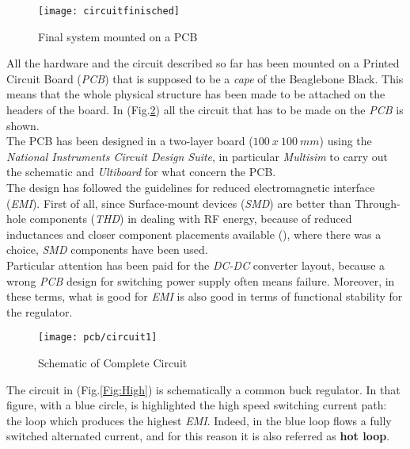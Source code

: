 

\begin{figure}[h]
	\centering
	\texttt{[image: circuitfinisched]}
	\caption{Final system mounted on a PCB}
	\label{Fig:finalcircuit}
\end{figure}


All the hardware and the circuit described so far has been mounted on a Printed Circuit Board (\textit{PCB}) that is supposed to be a \textit{cape} of the Beaglebone Black. This means that the whole physical structure has been made to be attached on the headers of the board. In (Fig.\ref{Fig:circuit}) all the circuit that has to be made on the \textit{PCB} is shown.\\

The PCB has been designed in a two-layer board ($100\ x\ 100\ mm$) using the \textit{National Instruments Circuit Design Suite},  in particular \textit{Multisim} to carry out the schematic and \textit{Ultiboard} for what concern the PCB.\\
The design has followed the guidelines for reduced electromagnetic interface (\textit{EMI}). First of all, since Surface-mount devices (\textit{SMD}) are better than Through-hole components (\textit{THD}) in dealing with RF energy, because of reduced inductances and closer component placements available (\cite{PDGFRE}), where there was a choice, \textit{SMD} components have been used. \\

Particular attention has been paid for the \textit{DC-DC} converter layout, because a wrong \textit{PCB} design for switching power supply often means failure. Moreover, in these terms, what is good for \textit{EMI} is also good in terms of functional stability for the regulator.\\




\begin{figure}[t]
	\begin{center}
	\texttt{[image: pcb/circuit1]}
	\caption{Schematic of Complete Circuit}
	\label{Fig:circuit}
	\end{center}
	
	
\end{figure}

 \clearpage
 
 The circuit in (Fig.\ref{Fig:High}) is schematically a common buck regulator. In that figure, with a blue circle, is highlighted the high speed switching current path: the loop which produces the highest \textit{EMI}. Indeed, in  the blue loop flows a fully switched alternated current, and for this reason it is also referred as \textbf{hot loop}.

